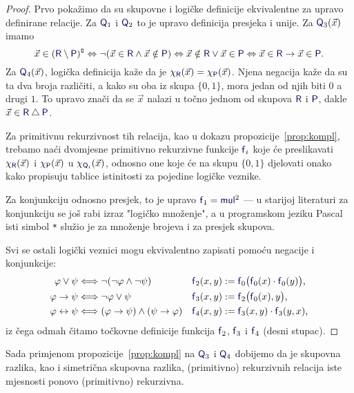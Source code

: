 \begin{proof}
	Prvo pokažimo da su skupovne i logičke definicije ekvivalentne za upravo definirane relacije. Za $\f Q_1$ i $\f Q_2$ to je upravo definicija presjeka i unije. Za $\f Q_3(\vec x)$ imamo
    \begin{equation}
    \vec x\in(\f R\setminus\f P)\kompl\Leftrightarrow\lnot(\vec x\in\f R\land\vec x\notin\f P)\Leftrightarrow\vec x\notin\f R\lor\vec x\in\f P\Leftrightarrow\vec x\in \f R\to\vec x\in\f P\text.
\end{equation}
	Za $\f Q_4(\vec x)$, logička definicija kaže da je $\chi_{\f R}(\vec x)=\chi_{\f P}(\vec x)$. Njena negacija kaže da su ta dva broja različiti, a kako su oba iz skupa $\{0,1\}$, mora jedan od njih biti $0$ a drugi $1$. To upravo znači da se $\vec x$ nalazi u točno jednom od skupova $\f R$ i $\f P$, dakle $\vec x\in\f R\mathbin\triangle\f P$.

Za primitivnu rekurzivnost tih relacija, kao u dokazu propozicije~\ref{prop:kompl}, trebamo naći dvomjesne primitivno rekurzivne funkcije $\f f_i$ koje će preslikavati $\chi_{\f R}(\vec x)$ i $\chi_{\f P}(\vec x)$ u $\chi_{\f Q_i}(\vec x)$, odnosno one koje će na skupu $\{0,1\}$ djelovati onako kako propisuju tablice istinitosti za pojedine logičke veznike.

Za konjunkciju odnosno presjek, to je upravo $\f f_1=\f{mul}^2$ --- u starijoj literaturi za konjunkciju se još rabi izraz "logičko množenje", a u programskom jeziku Pascal isti simbol \texttt{*} služio je za množenje brojeva i za presjek skupova.

Svi se ostali logički veznici mogu ekvivalentno zapisati pomoću negacije i konjunkcije:
\begin{align}
    \varphi\lor\psi&\Longleftrightarrow\lnot(\lnot\varphi\land\lnot\psi)
    &
    \f f_2(x,y)&:=
    \f f_0\bigl(
      \f f_0(x)\cdot\f f_0(y)
    \bigr)\text,
    \\
    \varphi\to\psi&\Longleftrightarrow\lnot\varphi\lor\psi
    &
    \f f_3(x,y)&:=\f f_2\bigl(\f f_0(x),y\bigr)\text,
    \\
    \varphi\leftrightarrow\psi&\Longleftrightarrow(\varphi\to\psi)\land(\psi\to\varphi)
    &
    \f f_4(x,y)&:=\f f_3(x,y)\cdot\f f_3(y,x)\text,
\end{align}
iz čega odmah čitamo točkovne definicije funkcija $\f f_2$, $\f f_3$ i $\f f_4$ (desni stupac).
\end{proof}

Sada primjenom propozicije~\ref{prop:kompl} na $\f Q_3$ i $\f Q_4$ dobijemo da je skupovna razlika, kao i simetrična skupovna razlika, (primitivno) rekurzivnih relacija iste mjesnosti ponovo (primitivno) rekurzivna.

